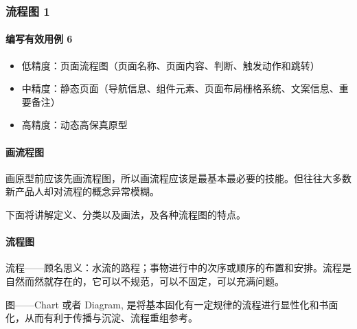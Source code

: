\documentclass[letterpaper,11pt,english]{sphinxmanual}
\begin{document}
\subsubsection{流程图 1\sphinxfootnotemark[505]}
\label{\detokenize{chapter_knowledge/flow_chart:id1}}\label{\detokenize{chapter_knowledge/flow_chart::doc}}%
\begin{footnotetext}[505]\sphinxAtStartFootnote
{}
%
\end{footnotetext}\ignorespaces 

\paragraph{编写有效用例 6\sphinxfootnotemark[506]}
\label{\detokenize{chapter_knowledge/flow_chart:id2}}%
\begin{footnotetext}[506]\sphinxAtStartFootnote
{}
%
\end{footnotetext}\ignorespaces \begin{itemize}
\item {} 
低精度：页面流程图（页面名称、页面内容、判断、触发动作和跳转）

\item {} 
中精度：静态页面（导航信息、组件元素、页面布局\sphinxhyphen{}栅格系统、文案信息、重要备注）

\item {} 
高精度：动态高保真原型

\end{itemize}


\paragraph{画流程图}
\label{\detokenize{chapter_knowledge/flow_chart:id3}}
画原型前应该先画流程图，所以画流程应该是最基本最必要的技能。但往往大多数新产品人却对流程的概念异常模糊。

下面将讲解定义、分类以及画法，及各种流程图的特点。


\paragraph{流程图}
\label{\detokenize{chapter_knowledge/flow_chart:id4}}
流程——顾名思义：水流的路程；事物进行中的次序或顺序的布置和安排。流程是自然而然就存在的，它可以不规范，可以不固定，可以充满问题。

图——Chart 或者 Diagram,
是将基本固化有一定规律的流程进行显性化和书面化，从而有利于传播与沉淀、流程重组参考。
\end{document}
